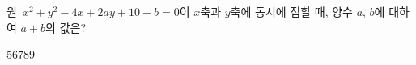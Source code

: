 원~$x^2+y^2-4x+2ay+10-b=0$이 $x$축과 $y$축에 동시에 접할 때, 양수 $a$, $b$에 대하여 $a+b$의 값은?
\begin{choices32}{$5$}{$6$}{$7$}{$8$}{$9$}\end{choices32}
